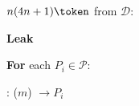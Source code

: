 \begin{bbox}[title={Functionality $\mathcal{F}_\msf{RBC} (\mathcal{D}, \mathcal{P})$}]

\OnInput {} \color{blue} {\bf $n(4n+1) \token$} \color{Black} from $\mathcal{D}$:

	\begin{renumerate}

		\item {\bf Leak} 
		
		\item {\bf For} each $P_i \in \mathcal{P}$:
		\begin{renumerate}

			\item \Eventually: \Send ($m$) $\rightarrow P_i$

		\end{renumerate}
	\end{renumerate}

%
\end{bbox}
